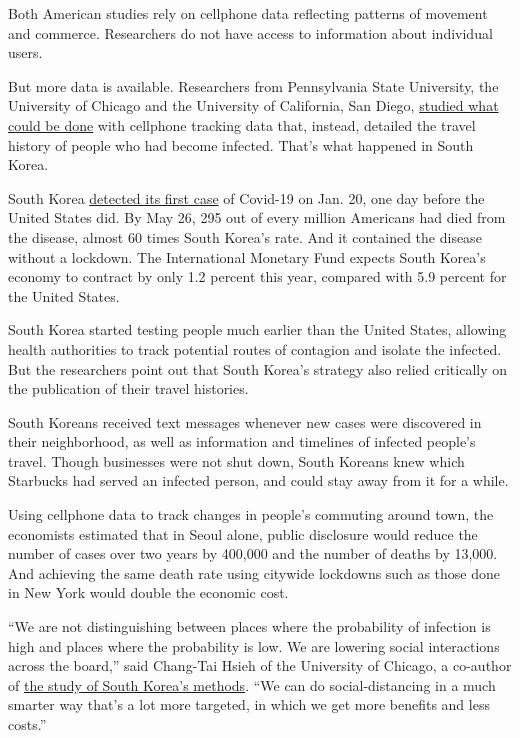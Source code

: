 Both American studies rely on cellphone data reflecting patterns of
movement and commerce. Researchers do not have access to information
about individual users.

But more data is available. Researchers from Pennsylvania State
University, the University of Chicago and the University of California,
San Diego,
\href{https://bfi.uchicago.edu/working-paper/the-cost-of-privacy-welfare-effects-of-the-disclosure-of-covid-19-cases/}{studied
what could be done} with cellphone tracking data that, instead, detailed
the travel history of people who had become infected. That's what
happened in South Korea.

South Korea
\href{https://www.nytimes3xbfgragh.onion/article/coronavirus-timeline.html}{detected
its first case} of Covid-19 on Jan. 20, one day before the United States
did. By May 26, 295 out of every million Americans had died from the
disease, almost 60 times South Korea's rate. And it contained the
disease without a lockdown. The International Monetary Fund expects
South Korea's economy to contract by only 1.2 percent this year,
compared with 5.9 percent for the United States.

South Korea started testing people much earlier than the United States,
allowing health authorities to track potential routes of contagion and
isolate the infected. But the researchers point out that South Korea's
strategy also relied critically on the publication of their travel
histories.

South Koreans received text messages whenever new cases were discovered
in their neighborhood, as well as information and timelines of infected
people's travel. Though businesses were not shut down, South Koreans
knew which Starbucks had served an infected person, and could stay away
from it for a while.

Using cellphone data to track changes in people's commuting around town,
the economists estimated that in Seoul alone, public disclosure would
reduce the number of cases over two years by 400,000 and the number of
deaths by 13,000. And achieving the same death rate using citywide
lockdowns such as those done in New York would double the economic cost.

``We are not distinguishing between places where the probability of
infection is high and places where the probability is low. We are
lowering social interactions across the board,'' said Chang-Tai Hsieh of
the University of Chicago, a co-author of
\href{https://bfi.uchicago.edu/working-paper/the-cost-of-privacy-welfare-effects-of-the-disclosure-of-covid-19-cases/}{the
study of South Korea's methods}. ``We can do social-distancing in a much
smarter way that's a lot more targeted, in which we get more benefits
and less costs.''

